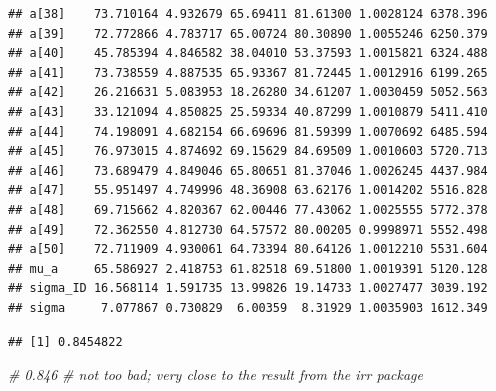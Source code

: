 \documentclass[
]{book}
\newenvironment{Shaded}{\begin{snugshade}}{\end{snugshade}}
\newcommand{\CommentTok}[1]{\textcolor[rgb]{0.56,0.35,0.01}{\textit{#1}}}
\newcommand{\DecValTok}[1]{\textcolor[rgb]{0.00,0.00,0.81}{#1}}
\newcommand{\FloatTok}[1]{\textcolor[rgb]{0.00,0.00,0.81}{#1}}
\newcommand{\FunctionTok}[1]{\textcolor[rgb]{0.13,0.29,0.53}{\textbf{#1}}}
\newcommand{\NormalTok}[1]{#1}
\newcommand{\OtherTok}[1]{\textcolor[rgb]{0.56,0.35,0.01}{#1}}
\newcommand{\SpecialCharTok}[1]{\textcolor[rgb]{0.81,0.36,0.00}{\textbf{#1}}}
\begin{document}
\begin{verbatim}
## a[38]    73.710164 4.932679 65.69411 81.61300 1.0028124 6378.396
## a[39]    72.772866 4.783717 65.00724 80.30890 1.0055246 6250.379
## a[40]    45.785394 4.846582 38.04010 53.37593 1.0015821 6324.488
## a[41]    73.738559 4.887535 65.93367 81.72445 1.0012916 6199.265
## a[42]    26.216631 5.083953 18.26280 34.61207 1.0030459 5052.563
## a[43]    33.121094 4.850825 25.59334 40.87299 1.0010879 5411.410
## a[44]    74.198091 4.682154 66.69696 81.59399 1.0070692 6485.594
## a[45]    76.973015 4.874692 69.15629 84.69509 1.0010603 5720.713
## a[46]    73.689479 4.849046 65.80651 81.37046 1.0026245 4437.984
## a[47]    55.951497 4.749996 48.36908 63.62176 1.0014202 5516.828
## a[48]    69.715662 4.820367 62.00446 77.43062 1.0025555 5772.378
## a[49]    72.362550 4.812730 64.57572 80.00205 0.9998971 5552.498
## a[50]    72.711909 4.930061 64.73394 80.64126 1.0012210 5531.604
## mu_a     65.586927 2.418753 61.82518 69.51800 1.0019391 5120.128
## sigma_ID 16.568114 1.591735 13.99826 19.14733 1.0027477 3039.192
## sigma     7.077867 0.730829  6.00359  8.31929 1.0035903 1612.349
\end{verbatim}

\begin{Shaded}
\end{Shaded}

\begin{verbatim}
## [1] 0.8454822
\end{verbatim}

\begin{Shaded}
\begin{Highlighting}[]
\CommentTok{\# 0.846}
\CommentTok{\# not too bad; very close to the result from the irr package}
\end{Highlighting}
\end{Shaded}
\end{document}
